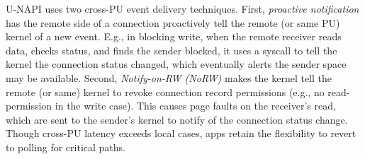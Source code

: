 U-NAPI uses two cross-PU event delivery techniques.
First, \emph{proactive notification} has the remote side of a connection proactively tell the remote (or same PU) kernel of a new event. 
E.g., in blocking write, when the remote receiver reads data, checks status, and finds the sender blocked, it uses a syscall to tell the kernel the connection status changed, which eventually alerts the sender space may be available.
Second, \emph{Notify-on-RW (NoRW)} makes the kernel tell the remote (or same) kernel to revoke connection record permissions (e.g., no read-permission in the write case). This causes page faults on the receiver's read, which are sent to the sender's kernel to notify of the connection status change. 
Though cross-PU latency exceeds local cases, apps retain the flexibility to revert to polling for critical paths.



